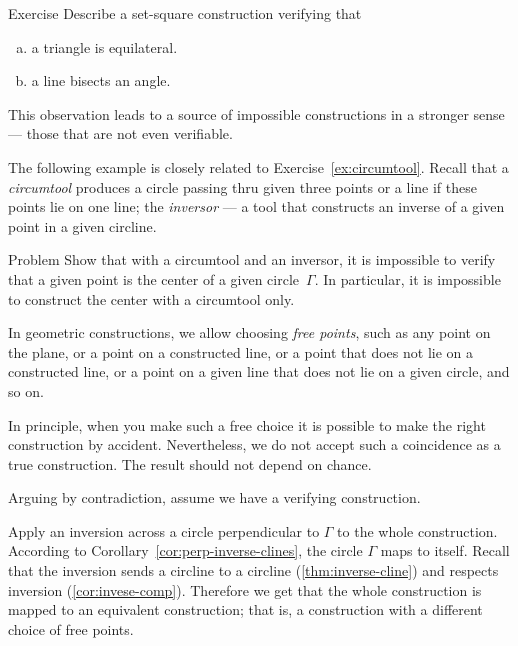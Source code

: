 \begin{thm}{Exercise}\label{ex:equilateral triangle-verify}
Describe a set-square construction verifying that 
\begin{enumerate}[(a)]
\item\label{ex:verify:triangle} a triangle is equilateral.
\item\label{ex:verify:bisector} a line bisects an angle.
\end{enumerate}
\end{thm}

This observation leads to a source of impossible constructions in a stronger sense --- those that are not even verifiable.

The following example is closely related to Exercise~\ref{ex:circumtool}.
Recall that a \emph{circumtool} produces a circle passing thru given three points
or a line if these points lie on one line;
the \emph{inversor} --- a tool that constructs an inverse of a given point in a given circline.


\begin{thm}{Problem}\label{prob:center-inversor+circumtool}
Show that with a circumtool and an inversor,
it is impossible to verify that a given point is the center of a given circle~$\Gamma$.
In particular, it is impossible to construct the center with a circumtool only.
\end{thm}

In geometric constructions, we allow choosing \emph{free points}, such as any point on the plane, or a point on a constructed line, or a point that does not lie on a constructed line, or a point on a given line that does not lie on a given circle, and so on.

In principle, when you make such a free choice it is possible to make the right construction by accident.
Nevertheless, we do not accept such a coincidence as a true construction.
The result should not depend on chance.


\label{page:solution-for-ex:circumtool}
Arguing by contradiction, 
assume we have a verifying construction. 

Apply an inversion across a circle perpendicular to $\Gamma$ to the whole construction.
According to Corollary~\ref{cor:perp-inverse-clines},
the circle
$\Gamma$ maps to itself.
Recall that the inversion sends a circline to a circline (\ref{thm:inverse-cline}) and respects inversion (\ref{cor:invese-comp}).
Therefore we get that the whole  construction is mapped to an equivalent construction; 
that is, a construction with a different choice of free points.

